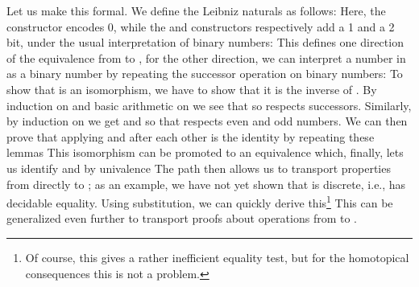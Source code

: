 Let us make this formal. We define the Leibniz naturals as follows:
Here, the  constructor encodes 0, while the  and  constructors respectively add a 1 and a 2 bit, under the usual interpretation of binary numbers:
This defines one direction of the equivalence from \bN{} to \bL{}, for the other direction, we can interpret a number in \bN{} as a binary number by repeating the successor operation on binary numbers:
To show that  is an isomorphism, we have to show that it is the inverse of . By induction on \bL{} and basic arithmetic on \bN{} we see that
so  respects successors. Similarly, by induction on \bN{} we get
and %
so that  respects even and odd numbers. We can then prove that applying  and  after each other is the identity by repeating these lemmas
This isomorphism can be promoted to an equivalence
which, finally, lets us identify \bN{} and \bL{} by univalence
The path  then allows us to transport properties from \bN{} directly to \bL{}; as an example, we have not yet shown that \bL{} is discrete, i.e., has decidable equality. Using substitution, we can quickly derive this\footnote{Of course, this gives a rather inefficient equality test, but for the homotopical consequences this is not a problem.}
This can be generalized even further to transport proofs about operations from \bN{} to \bL{}.

